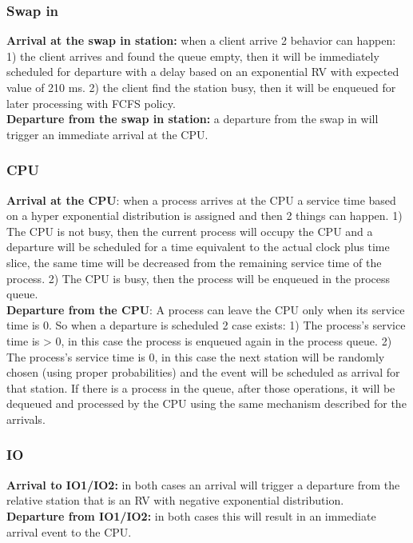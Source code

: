 \documentclass[12pt,a4paper]{article}
\begin{document}
\subsubsection{Swap in}
\textbf{Arrival at the swap in station:} when a client arrive 2 behavior can happen: 1) the client arrives and found the queue empty, then it will be immediately scheduled for departure with a delay based on an exponential RV with expected value of 210 ms. 2) the client find the station busy, then it will be enqueued for later processing with FCFS policy.
\\
\textbf{Departure from the swap in station:} a departure from the swap in will trigger an immediate arrival at the CPU.


\subsubsection{CPU}
\textbf{Arrival at the CPU}: when a process arrives at the CPU a service time based on a hyper exponential distribution is assigned and then 2 things can happen. 1) The CPU is not busy, then the current process will occupy the CPU and a departure will be scheduled for a time equivalent to the actual clock plus time slice, the same time will be decreased from the remaining service time of the process. 2) The CPU is busy, then the process will be enqueued in the process queue.
\\
\textbf{Departure from the CPU}: A process can leave the CPU only when its service time is 0. So when a departure is scheduled 2 case exists: 1) The process's service time is > 0, in this case the process is enqueued again in the process queue. 2) The process's service time is 0, in this case the next station will be randomly chosen (using proper probabilities) and the event will be scheduled as arrival for that station. If there is a process in the queue, after those operations, it will be dequeued and processed by the CPU using the same mechanism described for the arrivals.

\subsubsection{IO}

\textbf{Arrival to IO1/IO2:} in both cases an arrival will trigger a departure from the relative station that is an RV with negative exponential distribution.
\\
\textbf{Departure from IO1/IO2:} in both cases this will result in an immediate arrival event to the CPU.
\end{document}
